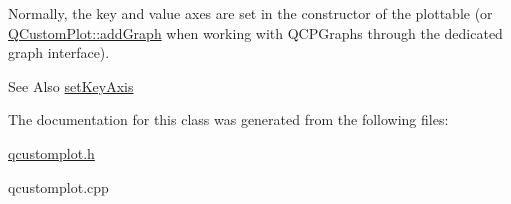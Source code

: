 Normally, the key and value axes are set in the constructor of the plottable (or \hyperlink{classQCustomPlot_a6fb2873d35a8a8089842d81a70a54167}{Q\-Custom\-Plot\-::add\-Graph} when working with Q\-C\-P\-Graphs through the dedicated graph interface).

\begin{DoxySeeAlso}{See Also}
\hyperlink{classQCPAbstractPlottable_a8524fa2994c63c0913ebd9bb2ffa3920}{set\-Key\-Axis} 
\end{DoxySeeAlso}


The documentation for this class was generated from the following files\-:\begin{DoxyCompactItemize}
\item 
\hyperlink{qcustomplot_8h}{qcustomplot.\-h}\item 
qcustomplot.\-cpp\end{DoxyCompactItemize}
